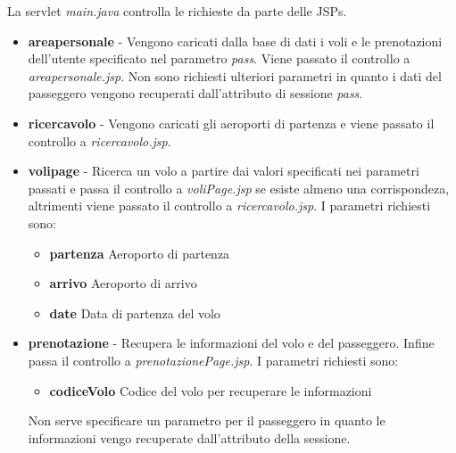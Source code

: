\documentclass[a4paper,10pt]{article}
\begin{document}
La servlet \textit{main.java} controlla le richieste da parte delle JSPs.

\begin{itemize}
 \item \textbf{areapersonale} - Vengono caricati dalla base di dati i voli e le prenotazioni dell'utente specificato nel parametro \textit{pass}. Viene passato il controllo 
			a \textit{areapersonale.jsp}. Non sono richiesti ulteriori parametri in quanto i dati del passeggero vengono recuperati dall'attributo di sessione
			\textit{pass}.

 \item \textbf{ricercavolo} - Vengono caricati gli aeroporti di partenza e viene passato il controllo a \textit{ricercavolo.jsp}.
 \item \textbf{volipage} - Ricerca un volo a partire dai valori specificati nei parametri passati e passa il controllo a \textit{voliPage.jsp} se esiste almeno una corrispondeza, altrimenti
		  viene passato il controllo a \textit{ricercavolo.jsp}.
		  I parametri richiesti sono:
		  \begin{itemize}
		   \item \textbf{partenza} Aeroporto di partenza
		   \item \textbf{arrivo} Aeroporto di arrivo
		   \item \textbf{date} Data di partenza del volo
		  \end{itemize}

 \item \textbf{prenotazione} - Recupera le informazioni del volo e del passeggero. Infine passa il controllo a \textit{prenotazionePage.jsp}. 
				I parametri richiesti sono:
				\begin{itemize}
				 \item \textbf{codiceVolo} Codice del volo per recuperare le informazioni
				\end{itemize}
				
				Non serve specificare un parametro per il passeggero in quanto le informazioni vengo recuperate dall'attributo della sessione.


\end{itemize}
\end{document}
